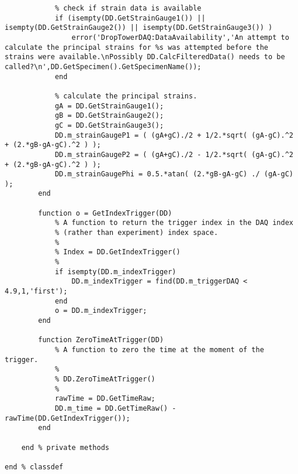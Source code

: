\begin{lstlisting}
            % check if strain data is available
            if (isempty(DD.GetStrainGauge1()) || isempty(DD.GetStrainGauge2()) || isempty(DD.GetStrainGauge3()) )
                error('DropTowerDAQ:DataAvailability','An attempt to calculate the principal strains for %s was attempted before the strains were available.\nPossibly DD.CalcFilteredData() needs to be called?\n',DD.GetSpecimen().GetSpecimenName());
            end

            % calculate the principal strains.
            gA = DD.GetStrainGauge1();
            gB = DD.GetStrainGauge2();
            gC = DD.GetStrainGauge3();
            DD.m_strainGaugeP1 = ( (gA+gC)./2 + 1/2.*sqrt( (gA-gC).^2 + (2.*gB-gA-gC).^2 ) );
            DD.m_strainGaugeP2 = ( (gA+gC)./2 - 1/2.*sqrt( (gA-gC).^2 + (2.*gB-gA-gC).^2 ) );
            DD.m_strainGaugePhi = 0.5.*atan( (2.*gB-gA-gC) ./ (gA-gC) );    
        end
        
        function o = GetIndexTrigger(DD)
            % A function to return the trigger index in the DAQ index
            % (rather than experiment) index space.
            %
            % Index = DD.GetIndexTrigger()
            %
            if isempty(DD.m_indexTrigger)
                DD.m_indexTrigger = find(DD.m_triggerDAQ < 4.9,1,'first');
            end
            o = DD.m_indexTrigger;
        end
        
        function ZeroTimeAtTrigger(DD)
            % A function to zero the time at the moment of the trigger.
            %
            % DD.ZeroTimeAtTrigger()
            %
            rawTime = DD.GetTimeRaw;
            DD.m_time = DD.GetTimeRaw() - rawTime(DD.GetIndexTrigger());
        end
        
    end % private methods

end % classdef
\end{lstlisting}

